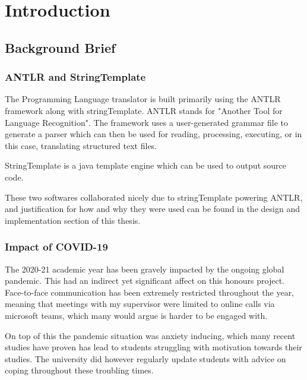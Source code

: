 \documentclass{l4proj}
\begin{document}
\chapter{Introduction}



\section{Background Brief}
\subsection{ANTLR and StringTemplate}
The Programming Language translator is built primarily using the ANTLR framework along with stringTemplate.
ANTLR stands for "Another Tool for Language Recognition". The framework uses a user-generated grammar file to generate a parser which can then be used for reading, processing, executing, or in this case, translating structured text files.

StringTemplate is a java template engine which can be used to output source code.

These two softwares collaborated nicely due to stringTemplate powering ANTLR, and justification for how and why they were used can be found in the design and implementation section of this thesis.

\subsection{Impact of COVID-19}
The 2020-21 academic year has been gravely impacted by the ongoing global pandemic. This had an indirect yet significant affect on this honours project. Face-to-face communication has been extremely restricted throughout the year, meaning that meetings with my supervisor were limited to online calls via microsoft teams, which many would argue is harder to be engaged with.

On top of this the pandemic situation was anxiety inducing, which many recent studies have proven has lead to students struggling with motivation towards their studies. The university did however regularly update students with advice on coping throughout these troubling times.
\end{document}
